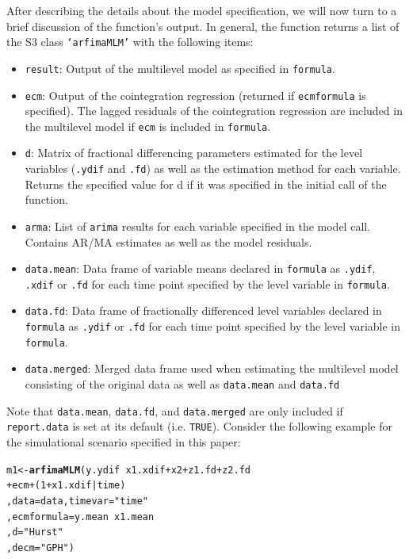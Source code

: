 \documentclass[12pt]{paper}\usepackage[]{graphicx}\usepackage[]{color}
\makeatletter
\newcommand{\hlnum}[1]{\textcolor[rgb]{0.686,0.059,0.569}{#1}}%
\newcommand{\hlstr}[1]{\textcolor[rgb]{0.192,0.494,0.8}{#1}}%
\newcommand{\hlopt}[1]{\textcolor[rgb]{0,0,0}{#1}}%
\newcommand{\hlstd}[1]{\textcolor[rgb]{0.345,0.345,0.345}{#1}}%
\newcommand{\hlkwb}[1]{\textcolor[rgb]{0.69,0.353,0.396}{#1}}%
\newcommand{\hlkwc}[1]{\textcolor[rgb]{0.333,0.667,0.333}{#1}}%
\newcommand{\hlkwd}[1]{\textcolor[rgb]{0.737,0.353,0.396}{\textbf{#1}}}%
\newenvironment{kframe}{%
 \def\at@end@of@kframe{}%
 \ifinner\ifhmode%
  \def\at@end@of@kframe{\end{minipage}}%
  \begin{minipage}{\columnwidth}%
 \fi\fi%
 \def\FrameCommand##1{\hskip\@totalleftmargin \hskip-\fboxsep
 \colorbox{shadecolor}{##1}\hskip-\fboxsep
     \hskip-\linewidth \hskip-\@totalleftmargin \hskip\columnwidth}%
 \MakeFramed {\advance\hsize-\width
   \@totalleftmargin\z@ \linewidth\hsize
   \@setminipage}}%
 {\par\unskip\endMakeFramed%
 \at@end@of@kframe}
\newenvironment{knitrout}{}{} %
\makeatother
\begin{document}
After describing the details about the model specification, we will now turn to a brief discussion of the function's output. In general, the function returns a list of the S3 class \texttt{`arfimaMLM'} with the following items:
\begin{itemize}
\item \texttt{result}: Output of the multilevel model as specified in \texttt{formula}.
\item \texttt{ecm}: Output of the cointegration regression (returned if \texttt{ecmformula} is specified). The lagged residuals of the cointegration regression are included in the multilevel model if \texttt{ecm} is included in \texttt{formula}.
\item \texttt{d}: Matrix of fractional differencing parameters estimated for the level variables (\texttt{.ydif} and \texttt{.fd}) as well as the estimation method for each variable. Returns the specified value for d if it was specified in the initial call of the function.
\item \texttt{arma}: List of \texttt{arima} results for each variable specified in the model call. Contains AR/MA estimates as well as the model residuals.
\item \texttt{data.mean}: Data frame of variable means declared in \texttt{formula} as \texttt{.ydif}, \texttt{.xdif} or \texttt{.fd} for each time point specified by the level variable in \texttt{formula}.
\item \texttt{data.fd}: Data frame of fractionally differenced level variables declared in \texttt{formula} as \texttt{.ydif} or \texttt{.fd} for each time point specified by the level variable in \texttt{formula}.
\item \texttt{data.merged}: Merged data frame used when estimating the multilevel model consisting of the original data as well as \texttt{data.mean} and \texttt{data.fd}
\end{itemize}

Note that \texttt{data.mean}, \texttt{data.fd}, and \texttt{data.merged} are only included if \texttt{report.data} is set at its default (i.e. \texttt{TRUE}). Consider the following example for the simulational scenario specified in this paper:

\begin{knitrout}
\color{fgcolor}\begin{kframe}
\begin{alltt}
\hlstd{m1} \hlkwb{<-} \hlkwd{arfimaMLM}\hlstd{(y.ydif} \hlopt{~} \hlstd{x1.xdif} \hlopt{+} \hlstd{x2} \hlopt{+} \hlstd{z1.fd} \hlopt{+} \hlstd{z2.fd}
                \hlopt{+} \hlstd{ecm} \hlopt{+} \hlstd{(}\hlnum{1}\hlopt{+}\hlstd{x1.xdif}\hlopt{|}\hlstd{time)}
                \hlstd{,} \hlkwc{data} \hlstd{= data,} \hlkwc{timevar} \hlstd{=} \hlstr{"time"}
                \hlstd{,} \hlkwc{ecmformula} \hlstd{= y.mean} \hlopt{~} \hlstd{x1.mean}
                \hlstd{,} \hlkwc{d} \hlstd{=} \hlstr{"Hurst"}
                \hlstd{,} \hlkwc{decm} \hlstd{=} \hlstr{"GPH"}\hlstd{)}
\end{alltt}
\end{kframe}
\end{knitrout}
\end{document}
